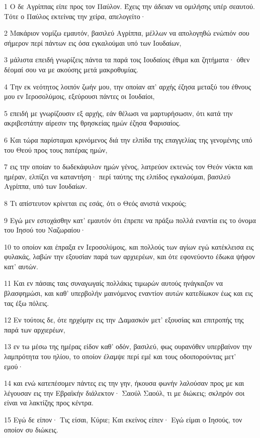\par 1 Ο δε Αγρίππας είπε προς τον Παύλον. Έχεις την άδειαν να ομιλήσης υπέρ σεαυτού. Τότε ο Παύλος εκτείνας την χείρα, απελογείτο·
\par 2 Μακάριον νομίζω εμαυτόν, βασιλεύ Αγρίππα, μέλλων να απολογηθώ ενώπιόν σου σήμερον περί πάντων εις όσα εγκαλούμαι υπό των Ιουδαίων,
\par 3 μάλιστα επειδή γνωρίζεις πάντα τα παρά τοις Ιουδαίοις έθιμα και ζητήματα· όθεν δέομαί σου να με ακούσης μετά μακροθυμίας.
\par 4 Την εκ νεότητος λοιπόν ζωήν μου, την οποίαν απ' αρχής έζησα μεταξύ του έθνους μου εν Ιεροσολύμοις, εξεύρουσι πάντες οι Ιουδαίοι,
\par 5 επειδή με γνωρίζουσιν εξ αρχής, εάν θέλωσι να μαρτυρήσωσιν, ότι κατά την ακριβεστάτην αίρεσιν της θρησκείας ημών έζησα Φαρισαίος.
\par 6 Και τώρα παρίσταμαι κρινόμενος διά την ελπίδα της επαγγελίας της γενομένης υπό του Θεού προς τους πατέρας ημών,
\par 7 εις την οποίαν το δωδεκάφυλον ημών γένος, λατρεύον εκτενώς τον Θεόν νύκτα και ημέραν, ελπίζει να καταντήση· περί ταύτης της ελπίδος εγκαλούμαι, βασιλεύ Αγρίππα, υπό των Ιουδαίων.
\par 8 Τι απίστευτον κρίνεται εις εσάς, ότι ο Θεός ανιστά νεκρούς;
\par 9 Εγώ μεν εστοχάσθην κατ' εμαυτόν ότι έπρεπε να πράξω πολλά εναντία εις το όνομα του Ιησού του Ναζωραίου·
\par 10 το οποίον και έπραξα εν Ιεροσολύμοις, και πολλούς των αγίων εγώ κατέκλεισα εις φυλακάς, λαβών την εξουσίαν παρά των αρχιερέων, και ότε εφονεύοντο έδωκα ψήφον κατ' αυτών.
\par 11 Και εν πάσαις ταις συναγωγαίς πολλάκις τιμωρών αυτούς ηνάγκαζον να βλασφημώσι, και καθ' υπερβολήν μαινόμενος εναντίον αυτών κατεδίωκον έως και εις τας έξω πόλεις.
\par 12 Εν τούτοις δε, ότε ηρχόμην εις την Δαμασκόν μετ' εξουσίας και επιτροπής της παρά των αρχιερέων,
\par 13 εν τω μέσω της ημέρας είδον καθ' οδόν, βασιλεύ, φως ουρανόθεν υπερβαίνον την λαμπρότητα του ηλίου, το οποίον έλαμψε περί εμέ και τους οδοιπορούντας μετ' εμού·
\par 14 και ενώ κατεπέσομεν πάντες εις την γην, ήκουσα φωνήν λαλούσαν προς με και λέγουσαν εις την Εβραϊκήν διάλεκτον· Σαούλ Σαούλ, τι με διώκεις; σκληρόν σοι είναι να λακτίζης προς κέντρα.
\par 15 Εγώ δε είπον· Τις είσαι, Κύριε; Και εκείνος είπεν· Εγώ είμαι ο Ιησούς, τον οποίον συ διώκεις.
